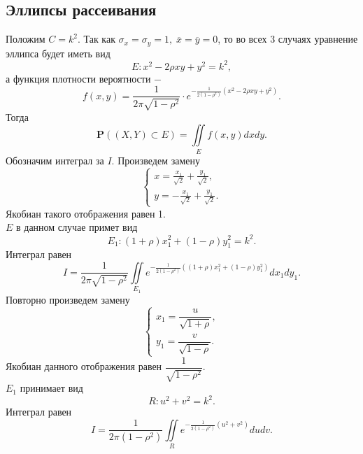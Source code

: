 \documentclass[a4paper]{article}
\begin{document}
\subsection{Эллипсы рассеивания}
Положим $C=k^2$. Так как $\sigma_x=\sigma_y=1,\;\overline{x}=\overline{y}=0$, то во всех 3 случаях уравнение эллипса будет иметь вид
\begin{equation*}
    E:x^2-2\rho xy + y^2=k^2,
\end{equation*}
а функция плотности вероятности $-$
\begin{equation*}
    f(x,y)=\dfrac{1}{2\pi\sqrt{1-\rho^2}}\cdot e^{-\frac{1}{2(1-\rho^2)}(x^2-2\rho xy + y^2)}.
\end{equation*}
Тогда
\begin{equation*}
 \mathbf{P}\left((X,Y)\subset E\right)=\iint \limits_{E}f(x,y) dx dy.
\end{equation*}
Обозначим интеграл за $I$. Произведем замену
\begin{equation*}
    \begin{cases}
    x=\frac{x_1}{\sqrt{2}}+\frac{y_1}{\sqrt{2}},\\
    y=-\frac{x_1}{\sqrt{2}}+\frac{y_1}{\sqrt{2}}.
    \end{cases}
\end{equation*}
Якобиан такого отображения равен 1.\\
$E$ в данном случае примет вид
\begin{equation*}
    E_1:(1+\rho)x_1^2+(1-\rho)y_1^2=k^2.
\end{equation*}
Интеграл равен
\begin{equation*}
    I=\dfrac{1}{2\pi\sqrt{1-\rho^2}}\iint \limits_{E_1}e^{-\frac{1}{2(1-\rho^2)}((1+\rho)x_1^2+(1-\rho)y_1^2)}dx_1 dy_1.
\end{equation*}
Повторно произведем замену
\begin{equation*}
    \begin{cases}
    x_1=\dfrac{u}{\sqrt{1+\rho}},\\
    y_1=\dfrac{v}{\sqrt{1-\rho}}.
    \end{cases}
\end{equation*}
Якобиан данного отображения равен $\dfrac{1}{\sqrt{1-\rho^2}}$.\\
$E_1$ принимает вид
\begin{equation*}
    R: u^2+v^2=k^2.
\end{equation*}
Интеграл равен
\begin{equation*}
    I=\dfrac{1}{2\pi(1-\rho^2)}\iint \limits_{R}e^{-\frac{1}{2(1-\rho^2)}(u^2+v^2)}du dv.
\end{equation*}
\end{document}
